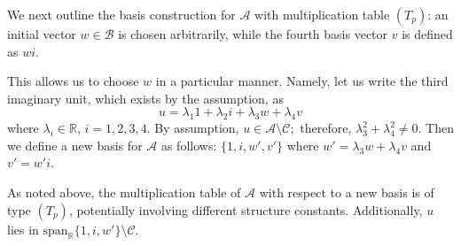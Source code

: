 \documentclass{amsart}
\theoremstyle{definition}
\theoremstyle{plain}
\begin{document}
We next outline the basis construction for $\mathcal{A}$ with multiplication table $(T_p)$: an initial vector $w \in \mathcal{B}$ is chosen arbitrarily, while the fourth basis vector $v$ is defined as $wi$. 

 This  allows us to choose $w$ in a particular manner. Namely, let us write the third imaginary unit, which exists by the assumption, as
$$u = \lambda_1 1 + \lambda_2 i +\lambda_3 w +\lambda_4 v$$ where $\lambda_i \in \mathbb R$, $i=1, 2, 3, 4.$  By assumption,
 $u \in \mathcal A \setminus \mathcal C;$ therefore, $\lambda^2_3 + \lambda^2_4 \neq 0$.
Then we define a new basis for $\mathcal A$ as follows: $\{1, i, w', v'\}$ where $w' =  \lambda_3 w +\lambda_4 v$ and $v'= w'i$.

As noted above, the multiplication table of $\mathcal{A}$ with respect to a new basis is of type $(T_p)$, potentially involving different structure constants. Additionally, $u$ lies in 
$\mathrm{span}_{\mathbb{R}}\{1, i, w'\}\setminus\mathcal{C}$.


\end{document}
